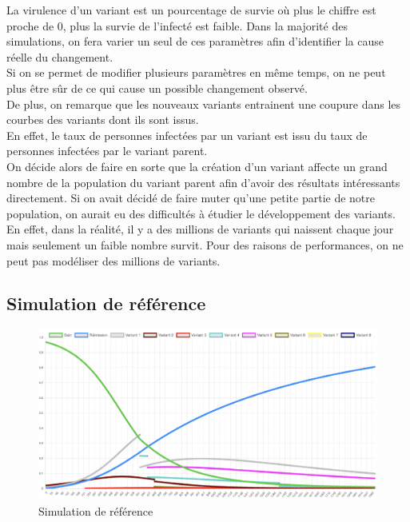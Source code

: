 \documentclass{article}
\begin{document}
\noindent
La virulence d'un variant est un pourcentage de survie où plus le chiffre est proche de 0, plus la survie de l'infecté est faible.
Dans la majorité des simulations, on fera varier un seul de ces paramètres afin d'identifier la cause réelle du changement. \\
Si on se permet de modifier plusieurs paramètres en même temps, on ne peut plus être sûr de ce qui cause un possible changement observé. \\
\noindent
De plus, on remarque que les nouveaux variants entrainent une coupure dans les courbes des variants dont ils sont issus. \\
En effet, le taux de personnes infectées par un variant est issu du taux de personnes infectées par le variant parent. \\
On décide alors de faire en sorte que la création d'un variant affecte un grand nombre de la population du variant parent afin d'avoir des résultats intéressants directement. Si on avait décidé de faire muter qu'une petite partie de notre population, on aurait eu des difficultés à étudier le développement des variants. En effet, dans la réalité, il y a des millions de variants qui naissent chaque jour mais seulement un faible nombre survit. Pour des raisons de performances, on ne peut pas modéliser des millions de variants.

\subsection{Simulation de référence}

\begin{figure}[h]
    \includegraphics[width=\linewidth]{images/Simulation1.png}
    \caption{Simulation de référence}
    \label{fig:simulation1}
\end{figure}
\end{document}
